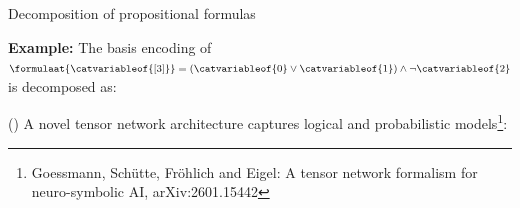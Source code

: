 \documentclass{beamer}
\begin{document}
\begin{frame}{Decomposition of propositional formulas}
        \begin{minipage}{0.45\textwidth}
            {\bf Example:}
            The basis encoding of $\formulaat{\catvariableof{[3]}} = (\catvariableof{0} \lor \catvariableof{1}) \land \lnot \catvariableof{2}$ is decomposed as:
        \end{minipage}
        \begin{minipage}{0.45\textwidth}
            \begin{center}
                
            \end{center}
        \end{minipage}

    \end{frame}


%
%
%
%                
%

    \begin{frame}{\ComputationActivationNetworks{} (\CompActNets{})}
        A novel tensor network architecture captures logical and probabilistic models\footnote{\tiny Goessmann, Schütte, Fröhlich and Eigel: A tensor network formalism for neuro-symbolic AI, arXiv:2601.15442}:
        \begin{center}
            
        \end{center}

    \end{frame}
\end{document}
